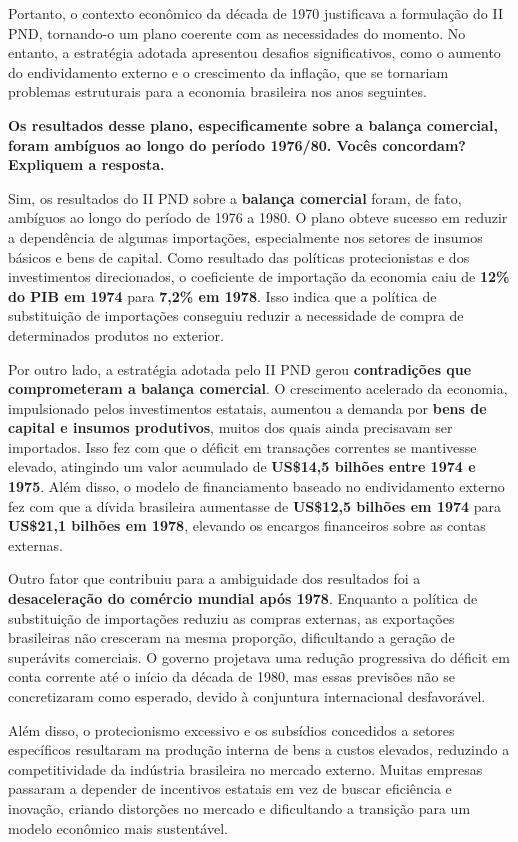 \documentclass[a4paper,12pt]{article}[abntex2]
\begin{document}
Portanto, o contexto econômico da década de 1970 justificava a formulação do II PND, tornando-o um plano coerente com as necessidades do momento. No entanto, a estratégia adotada apresentou desafios significativos, como o aumento do endividamento externo e o crescimento da inflação, que se tornariam problemas estruturais para a economia brasileira nos anos seguintes.

\textbf{Os resultados desse plano, especificamente sobre a balança comercial, foram ambíguos ao longo do período 1976/80. Vocês concordam? Expliquem a resposta.}

Sim, os resultados do II PND sobre a \textbf{balança comercial} foram, de fato, ambíguos ao longo do período de 1976 a 1980. O plano obteve sucesso em reduzir a dependência de algumas importações, especialmente nos setores de insumos básicos e bens de capital. Como resultado das políticas protecionistas e dos investimentos direcionados, o coeficiente de importação da economia caiu de \textbf{12\% do PIB em 1974} para \textbf{7,2\% em 1978}. Isso indica que a política de substituição de importações conseguiu reduzir a necessidade de compra de determinados produtos no exterior.

Por outro lado, a estratégia adotada pelo II PND gerou \textbf{contradições que comprometeram a balança comercial}. O crescimento acelerado da economia, impulsionado pelos investimentos estatais, aumentou a demanda por \textbf{bens de capital e insumos produtivos}, muitos dos quais ainda precisavam ser importados. Isso fez com que o déficit em transações correntes se mantivesse elevado, atingindo um valor acumulado de \textbf{US\$14,5 bilhões entre 1974 e 1975}. Além disso, o modelo de financiamento baseado no endividamento externo fez com que a dívida brasileira aumentasse de \textbf{US\$12,5 bilhões em 1974} para \textbf{US\$21,1 bilhões em 1978}, elevando os encargos financeiros sobre as contas externas.

Outro fator que contribuiu para a ambiguidade dos resultados foi a \textbf{desaceleração do comércio mundial após 1978}. Enquanto a política de substituição de importações reduziu as compras externas, as exportações brasileiras não cresceram na mesma proporção, dificultando a geração de superávits comerciais. O governo projetava uma redução progressiva do déficit em conta corrente até o início da década de 1980, mas essas previsões não se concretizaram como esperado, devido à conjuntura internacional desfavorável.

Além disso, o protecionismo excessivo e os subsídios concedidos a setores específicos resultaram na produção interna de bens a custos elevados, reduzindo a competitividade da indústria brasileira no mercado externo. Muitas empresas passaram a depender de incentivos estatais em vez de buscar eficiência e inovação, criando distorções no mercado e dificultando a transição para um modelo econômico mais sustentável.
\end{document}
